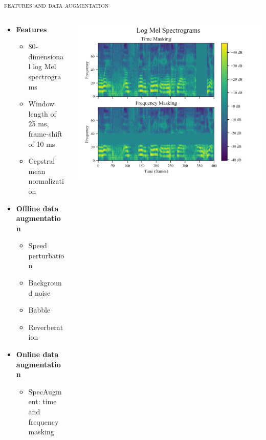 \documentclass[10pt,aspectratio=1610,professionalfont]{beamer}
\begin{document}
\begin{frame}{\textsc{features and data augmentation}}
 \begin{columns}
	\begin{column}{0.45\textwidth}
		\begin{itemize}
		        \item \textbf{Features}
		        \begin{itemize}
		            \item 80-dimensional log Mel spectrograms
		            \item Window length of 25 ms, frame-shift of 10 ms
		            \item Cepstral mean normalization  
		        \end{itemize} 
		        \item \textbf{Offline data augmentation}
		        \begin{itemize}
		            \item Speed perturbation
				\item Background noise
				\item Babble
				\item Reverberation 
		        \end{itemize}
		        \item \textbf{Online data augmentation}
		        \begin{itemize}
		            \item SpecAugment: time and frequency masking
		        \end{itemize} 
    		\end{itemize}
	\end{column}
	\begin{column}{0.55\textwidth}
	\begin{center}
     		\includegraphics[width=1.0\textwidth]{img/spec_aug.png}
    	\end{center}
	\end{column}
 \end{columns}
	
    
\end{frame}
\end{document}

